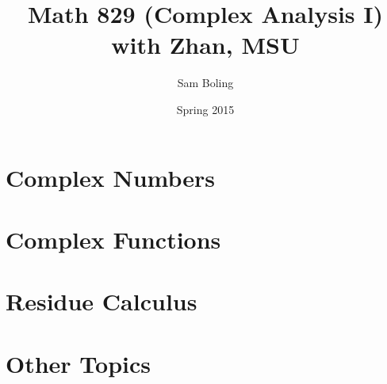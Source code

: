 \documentclass{report}
\title{Math 829 (Complex Analysis I) with Zhan, MSU}
\author{Sam Boling}
\date{Spring 2015}
\begin{document}
\maketitle

\chapter{Complex Numbers}



\chapter{Complex Functions}







\chapter{Residue Calculus}





\chapter{Other Topics}


\end{document}
